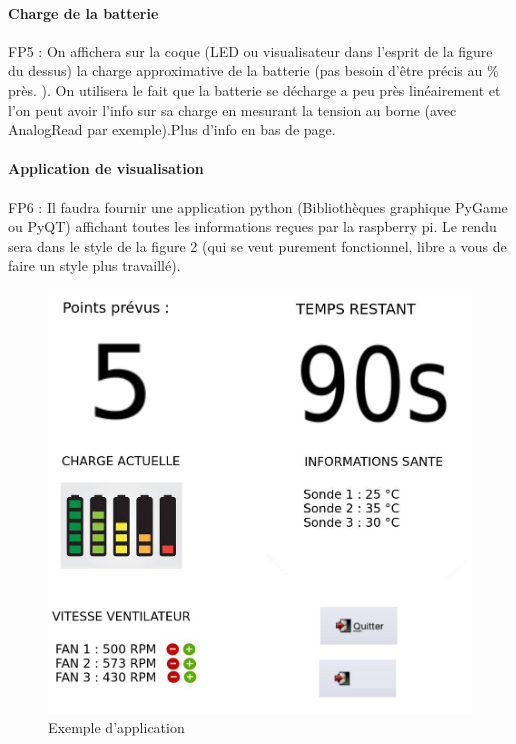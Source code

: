 \documentclass[fleqn,10pt]{SelfArx} %
\begin{document}
\paragraph{Charge de la batterie}
FP5 : On affichera sur la coque (LED ou visualisateur dans l'esprit de la figure du dessus) la charge approximative de la batterie (pas besoin d'être précis au \% près. ). On utilisera le fait que la batterie se décharge a peu près linéairement et l'on peut avoir l'info sur sa charge en mesurant la tension au borne (avec AnalogRead par exemple).Plus d'info en bas de page.
\paragraph{Application de visualisation}
FP6 : Il faudra fournir une application python (Bibliothèques graphique PyGame ou PyQT) affichant toutes les informations reçues par la raspberry pi. Le rendu sera dans le style de la figure 2 (qui se veut purement fonctionnel, libre a vous de faire un style plus travaillé).
\begin{figure}[ht]\centering %
	\includegraphics[width=\linewidth]{app}
	\caption{Exemple d'application}
	\label{fig:view}
\end{figure}
\end{document}
